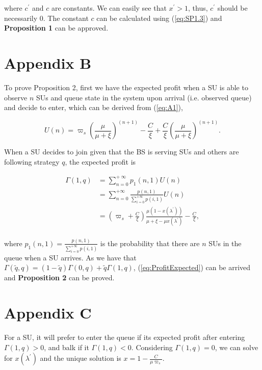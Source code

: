 \documentclass[journal]{IEEEtran}
\begin{document}
\noindent where $c^{'}$ and $c$ are constants. We can easily see
 that $x^{'} > 1$, thus, $c^{'}$ should be necessarily $0$. The constant $c$ can be
calculated using (\ref{eq:SP1.3}) and \textbf{Proposition 1} can
be approved.


\section*{Appendix B}

To prove Proposition 2, first we have the expected profit when a
SU is able to observe $n$ SUs and queue state in the system upon
arrival (i.e. observed queue) and decide to enter, which can be
derived from (\ref{eq:A1}),

\begin{equation}
\label{eq:A3} U(n)= \varpi_s\left( \frac{\mu}{\mu+\xi}
\right)^{(n+1)} - \frac{C}{\xi} + \frac{C}{\xi}\left(
\frac{\mu}{\mu+\xi} \right)^{(n+1)}.
\end{equation}


When a SU decides to join given that the BS is serving SUs and
others are following strategy $q$, the expected profit is

\begin{equation}
\begin{split}
\label{eq:A2}
\Gamma(1,q) &= \sum_{n=0}^{+\ \infty}p_{1}(n,1) U(n) \\
&= \sum_{n=0}^{+ \infty} \frac{p(n,1)}{\sum_{i=0}^{+ \infty}p(i,1)} U(n) \\
&= \left( \varpi_s+ \frac{C}{\xi} \right)
\frac{\mu(1-x(\lambda^{'}))}{\mu+\xi-\mu x(\lambda^{'})} - \frac{C}{\xi}, \\
\end{split}
\end{equation}

\noindent where $p_{1}(n,1) = \frac{p(n,1)}{\sum_{i=0}^{+
\infty}p(i,1)}$ is the probability that there are $n$ SUs in the
queue when a SU arrives. As we have that $\Gamma(\tilde{q},q) =
(1-\tilde{q})\Gamma(0,q)+ \tilde{q}\Gamma(1,q)$,
(\ref{eq:ProfitExpected}) can be arrived and \textbf{Proposition
2} can be proved.

\section*{Appendix C}

For a SU, it will prefer to enter the queue if its expected profit
after entering $\Gamma(1,q)>0$, and balk if it $\Gamma(1,q)<0$.
Considering $\Gamma(1,q)=0$, we can solve for $x(\lambda^{'})$ and
the unique solution is $x = 1- \frac{C}{\mu \varpi_s }$. \par
\end{document}
